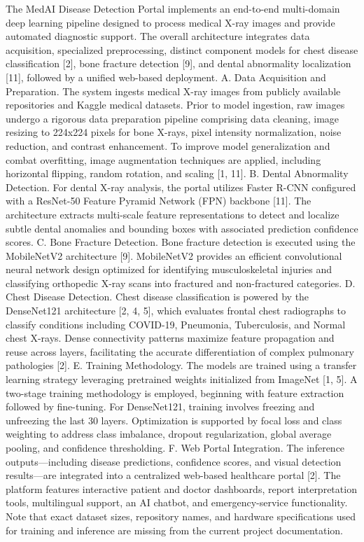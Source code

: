 \documentclass[conference]{IEEEtran}
\begin{document}
The MedAI Disease Detection Portal implements an end-to-end multi-domain deep learning pipeline designed to process medical X-ray images and provide automated diagnostic support. The overall architecture integrates data acquisition, specialized preprocessing, distinct component models for chest disease classification [2], bone fracture detection [9], and dental abnormality localization [11], followed by a unified web-based deployment. A. Data Acquisition and Preparation. The system ingests medical X-ray images from publicly available repositories and Kaggle medical datasets. Prior to model ingestion, raw images undergo a rigorous data preparation pipeline comprising data cleaning, image resizing to 224x224 pixels for bone X-rays, pixel intensity normalization, noise reduction, and contrast enhancement. To improve model generalization and combat overfitting, image augmentation techniques are applied, including horizontal flipping, random rotation, and scaling [1, 11]. B. Dental Abnormality Detection. For dental X-ray analysis, the portal utilizes Faster R-CNN configured with a ResNet-50 Feature Pyramid Network (FPN) backbone [11]. The architecture extracts multi-scale feature representations to detect and localize subtle dental anomalies and bounding boxes with associated prediction confidence scores. C. Bone Fracture Detection. Bone fracture detection is executed using the MobileNetV2 architecture [9]. MobileNetV2 provides an efficient convolutional neural network design optimized for identifying musculoskeletal injuries and classifying orthopedic X-ray scans into fractured and non-fractured categories. D. Chest Disease Detection. Chest disease classification is powered by the DenseNet121 architecture [2, 4, 5], which evaluates frontal chest radiographs to classify conditions including COVID-19, Pneumonia, Tuberculosis, and Normal chest X-rays. Dense connectivity patterns maximize feature propagation and reuse across layers, facilitating the accurate differentiation of complex pulmonary pathologies [2]. E. Training Methodology. The models are trained using a transfer learning strategy leveraging pretrained weights initialized from ImageNet [1, 5]. A two-stage training methodology is employed, beginning with feature extraction followed by fine-tuning. For DenseNet121, training involves freezing and unfreezing the last 30 layers. Optimization is supported by focal loss and class weighting to address class imbalance, dropout regularization, global average pooling, and confidence thresholding. F. Web Portal Integration. The inference outputs—including disease predictions, confidence scores, and visual detection results—are integrated into a centralized web-based healthcare portal [2]. The platform features interactive patient and doctor dashboards, report interpretation tools, multilingual support, an AI chatbot, and emergency-service functionality. Note that exact dataset sizes, repository names, and hardware specifications used for training and inference are missing from the current project documentation.
\end{document}
